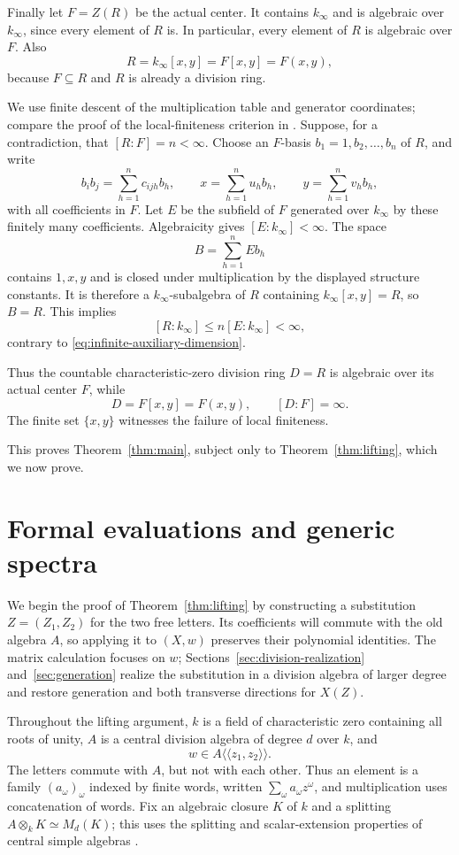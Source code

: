 \documentclass[11pt]{article}
\theoremstyle{definition}
\theoremstyle{remark}
\numberwithin{equation}{section}
\begin{document}
Finally let $F=Z(R)$ be the actual center.  It contains $k_\infty$ and
is algebraic over $k_\infty$, since every element of $R$ is.  In
particular, every element of $R$ is algebraic over $F$.  Also
\[
 R=k_\infty[x,y]=F[x,y]=F(x,y),
\]
because $F\subseteq R$ and $R$ is already a division ring.

We use finite descent of the multiplication table and generator
coordinates; compare the proof of the local-finiteness criterion in
\cite[Section~4]{DeoBienHai2019}. Suppose, for a contradiction, that
$[R:F]=n<\infty$. Choose an
$F$-basis $b_1=1,b_2,\ldots,b_n$ of $R$, and write
\[
 b_i b_j=\sum_{h=1}^n c_{ijh}b_h,
 \qquad
 x=\sum_{h=1}^n u_hb_h,
 \qquad
 y=\sum_{h=1}^n v_hb_h,
\]
with all coefficients in $F$.  Let $E$ be the subfield of $F$
generated over $k_\infty$ by these finitely many coefficients.
Algebraicity gives $[E:k_\infty]<\infty$.  The space
\[
 B=\sum_{h=1}^n E b_h
\]
contains $1,x,y$ and is closed under multiplication by the displayed
structure constants.  It is therefore a $k_\infty$-subalgebra of $R$
containing $k_\infty[x,y]=R$, so $B=R$.  This implies
\[
 [R:k_\infty]\leq n[E:k_\infty]<\infty,
\]
contrary to \eqref{eq:infinite-auxiliary-dimension}.

Thus the countable characteristic-zero division ring $D=R$ is
algebraic over its actual center $F$, while
\[
 D=F[x,y]=F(x,y),\qquad [D:F]=\infty.
\]
The finite set $\{x,y\}$ witnesses the failure of local finiteness.

This proves Theorem~\ref{thm:main}, subject only to Theorem~\ref{thm:lifting},
which we now prove.

\section{Formal evaluations and generic spectra}\label{sec:formal-generic}

We begin the proof of Theorem~\ref{thm:lifting} by constructing a
substitution $Z=(Z_1,Z_2)$ for the two free letters. Its coefficients will commute
with the old algebra $A$, so applying it to $(X,w)$ preserves their
polynomial identities. The matrix calculation focuses on $w$;
Sections~\ref{sec:division-realization} and~\ref{sec:generation}
realize the substitution in a division algebra of larger degree and
restore generation and both transverse directions for $X(Z)$.

Throughout the lifting argument, $k$ is a field of characteristic zero
containing all roots of unity, $A$ is a central division algebra of degree
$d$ over $k$, and
\[
 w\in A\langle\!\langle z_1,z_2\rangle\!\rangle.
\]
The letters commute with $A$, but not with each other.  Thus an element
is a family $(a_\omega)_\omega$ indexed by finite words, written
$\sum_\omega a_\omega z^\omega$, and multiplication uses concatenation
of words.  Fix an algebraic closure $K$ of $k$ and a splitting
$A\otimes_k K\simeq M_d(K)$; this uses the splitting and
scalar-extension properties of central simple algebras
\cite[Chapter~IV, Example~2.14(a) and Proposition~2.15]{MilneCFT}.
\end{document}

